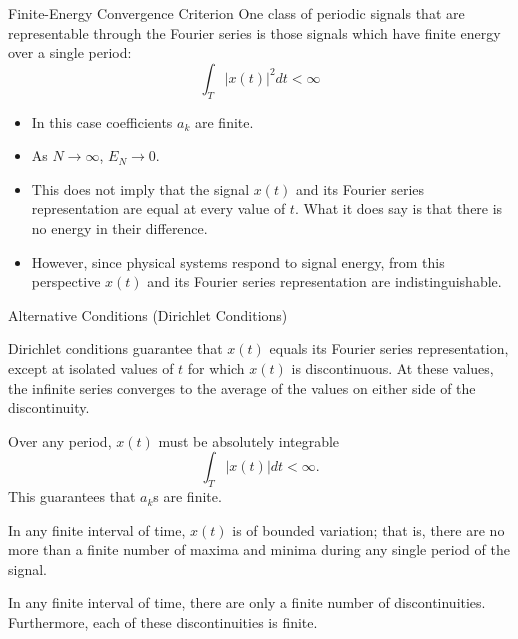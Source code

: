 \begin{frame}{Finite-Energy Convergence Criterion}
    One class of periodic signals that are representable through the Fourier series is those signals which have finite energy over a single period:
    \begin{equation}
        \int_T \left|x(t)\right|^2 dt < \infty
    \end{equation}

    \begin{itemize}[<+->]
        \item In this case coefficients $a_k$ are finite.
        \item As $N\rightarrow \infty$, $E_N \rightarrow 0$.
        \item This \alert{does not imply that the signal $x(t)$ and its Fourier series representation are equal at every value of $t$}. What it does say is that there is no energy in their difference.
        \item However, since physical systems respond to signal energy, from this perspective $x(t)$ and its Fourier series representation are indistinguishable.
    \end{itemize}
\end{frame}

\begin{frame}{Alternative Conditions (Dirichlet Conditions)}

    Dirichlet conditions guarantee that $x(t)$ \alert{equals} its Fourier series representation, except at isolated values of $t$ for which $x(t)$ is discontinuous. At these values, the infinite series converges to the average of the values on either side of the discontinuity.\\[10pt]


    Over any period, $x(t)$ must be absolutely integrable
    \begin{equation}
        \int_T \left|x(t)\right| dt < \infty.
    \end{equation}
    This guarantees that $a_k$s are finite. \\[10pt]




    In any finite interval of time, $x(t)$ is of bounded variation; that is, there are no more than a finite number of maxima and minima during any single period of the signal. \\[10pt]



    In any finite interval of time, there are only a finite number of discontinuities. Furthermore, each of these discontinuities is finite.

\end{frame}

